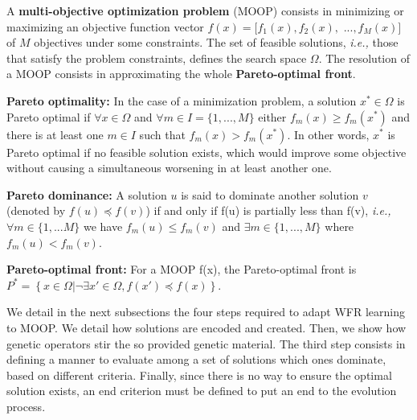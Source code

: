 \begin{definition}
	A \textbf{multi-objective optimization problem} (MOOP) consists in minimizing or maximizing an objective function vector $f(x)= [f_{1}(x),f_{2}(x),$ $...,f_{M}(x)]$ of $M$ objectives under some constraints. The set of feasible solutions, \emph{i.e.,} those that satisfy the problem constraints, defines the search space $\Omega$. The resolution of a MOOP consists in approximating the whole \textbf{Pareto-optimal front}.
\end{definition}
\begin{definition}
	\textbf{Pareto optimality: }In the case of a minimization problem, a solution $x^{*}\in\Omega$ is Pareto optimal if $\forall x\in\Omega$ and $\forall m\in I=\{1,...,M\}$ either $f_{m}(x)\ge f_{m}(x^{*})$ and there is at least one $m\in I$ such that $f_{m}(x)>f_{m}(x^{*})$. In other words, $x^{*}$ is Pareto optimal if no feasible solution exists, which would improve some objective without causing a simultaneous worsening in at least another one. %
\end{definition}
\begin{definition}	
	\textbf{Pareto dominance: }
	A solution $u$ is said to dominate another solution $v$  (denoted by $f(u)\preceq f(v)$) if and only if f(u) is partially less than f(v), \emph{i.e.,} $\forall m\in\{1,...M\}$ we have $f_{m}(u)\leq f_{m}(v)$ and $\exists m\in\{1,...,M\}$ where $f_{m}(u)<f_{m}(v)$.
\end{definition}
\begin{definition}	
	\textbf{Pareto-optimal front: }
	For a MOOP f(x), the Pareto-optimal front is $P^{*}=\left\{ x\in\Omega|\neg\exists x'\in\Omega, f(x')\preceq f(x)\right\} $.
\end{definition}


We detail in the next subsections the four steps required to adapt WFR learning to MOOP. We detail how solutions are encoded and created. Then, we show how genetic operators stir the so provided genetic material. The third step consists in defining a manner to evaluate among a set of solutions which ones dominate, based on different criteria. Finally, since there is no way to ensure the optimal solution exists, an end criterion must be defined to put an end to the evolution process.

